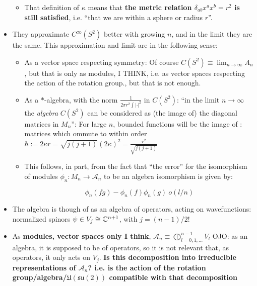 \documentclass{article}
\begin{document}
\begin{itemize}
\begin{itemize}
        \item That definition of $\kappa$ means that \textbf{the metric relation $\delta_{ab}x^a x^b = r^2$ is still satisfied}, i.e. ``that we are within a sphere or radius $r$''.
            
        \end{itemize}
    
    \item They approximate $C^\infty(S^2)$ better with growing $n$, and in the limit they are the same. This approximation and limit are in the following sense:
    
        \begin{itemize}
        
        \item As a vector space respecting symmetry: Of course $C(S^2) \equiv \lim_{n \to \infty} A_n$, but that is only as modules, I THINK, i.e. as vector spaces respecting the action of the rotation group., but that is not enough.
        
        \item As a $*$-algebra, with the norm $\frac{1}{2\pi r^2 \int |\cdot|^2}$ in $C(S^2)$: ``in the limit $n \to \infty$ the \textit{algebra} $C(S^2)$ can be considered as (the image of) the diagonal matrices in $M_n$'': For large $n$, bounded functions will be the image of : matrices which ommute to within order $\hbar:= 2 \kappa r = \sqrt{j(j+1)}(2\kappa)^2 = \frac{r^2}{\sqrt{j(j+1)}}$
        
        \item This follows, in part, from the fact that ``the error'' for the isomorphism of modules $\phi_n : M_n \to \mathcal A_n$ to be an algebra isomorphism is given by:
        
        \[
            \phi_n(fg) - \phi_n(f)\phi_n(g) ~ o(l/n)
        \]
            
        \end{itemize}
    
    \item The algebra is though of as an algebra of operators, acting on wavefunctions: normalized spinors $\psi \in V_j \cong \mathbb{C}^{n+1}$, with $j = (n-1)/2$!
    
    \item As \textbf{modules, vector spaces only I think}, $\mathcal A_n \equiv \bigoplus_{l = 0, 1, \dots}^{n-1} V_l$ OJO: as an algebra, it is supposed to be of operators, so it is not relevant that, as operators, it only acts on $V_j$. \textbf{Is this decomposition into irreducible representations of $\mathcal A_n$? i.e. is the action of the rotation group/algebra/$\mathfrak{U(su(2))}$ compatible with that decomposition} 
    

\end{itemize}
\end{document}
